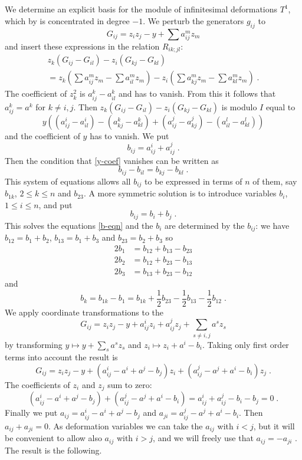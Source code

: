 \documentclass[12pt,a4paper]{amsart}  %
\theoremstyle{definition}
\theoremstyle{remark}
\begin{document}
\subsection{}
We determine an explicit basis for  the module of infinitesimal deformations   
$T^1$, which by \cite{Gr} is concentrated in degree $-1$. 
We perturb the generators $g_{ij}$ to
\[
G_{ij}=z_iz_j-y+\sum a_{ij}^mz_m
\]
and insert these expressions in the relation $R_{ik;jl}$:
\begin{multline*}
z_k(G_{ij}-G_{il})-z_i(G_{kj}-G_{kl})\\=
z_k\left(\sum a_{ij}^mz_m -\sum a_{il}^mz_m\right)
      -z_i\left(\sum a_{kj}^mz_m -\sum a_{kl}^mz_m\right)\;.
\end{multline*}
The coefficient of $z_k^2$ is $a_{ij}^k- a_{il}^k$ and has to vanish. From this it
follows that $a_{ij}^k=a^k$ for $k\neq i,j$. Then %
$z_k(G_{ij}-G_{il})-z_i(G_{kj}-G_{kl})$ is modulo $I$ equal to
\begin{equation}\label{y-coef}
y\left((a_{ij}^i-a_{il}^i)-(a_{kj}^k-a_{kl}^k)+(a_{ij}^j-a_{kj}^j)-(a_{il}^l-a_{kl}^l)\right)
\end{equation}
and the coefficient of $y$ has to vanish.
We put 
\[
b_{ij}=a_{ij}^i+a_{ij}^j\;.
\]
Then the condition that \eqref{y-coef} vanishes can be written as
\begin{equation}\label{b-eqn}
b_{ij}-b_{il}=b_{kj}-b_{kl}\;.
\end{equation}
This system of equations allows all $b_{ij}$ to be expressed in terms 
of $n$ of them, say $b_{1k}$, $2\leq k \leq n$ and $b_{23}$.  A more symmetric
solution is to introduce variables $b_i$, $1\leq i \leq n$, and put
\[
b_{ij} = b_i+b_j\;.
\]
This solves the equations \eqref{b-eqn} and the $b_i$ are determined by the
$b_{ij}$:
we have $b_{12}=b_1+b_2$, $b_{13}=b_1+b_3$ and $b_{23}=b_2+b_3$ so
\begin{align*}
2b_1&=b_{12}+b_{13}-b_{23}\\
2b_2&=b_{12}+b_{23}-b_{13}\\
2b_3&=b_{13}+b_{23}-b_{12}
\end{align*}
and
\[
b_k=b_{1k}-b_1=b_{1k}+\textstyle{\frac12 b_{23}-\frac12 b_{13}-\frac12 b_{12}}\;.
\]
We apply coordinate transformations to the
\[
G_{ij}=z_iz_j-y+ a_{ij}^iz_i+ a_{ij}^jz_j+ \sum_{s\neq i,j} a^sz_s
\]
by transforming 
$y\mapsto y+\sum_{s}a^s z_s$ and 
$ z_i\mapsto z_i+a^i-b_i$.
Taking only first order terms into account the result is
\[
G_{ij}=z_iz_j-y+ (a_{ij}^i-a^i+a^j-b_j)z_i+ (a_{ij}^j-a^j+a^i-b_i)z_j \;.
\]
The coefficients of $z_i$ and $z_j$ sum to zero:
\[
(a_{ij}^i-a^i+a^j-b_j)+ (a_{ij}^j-a^j+a^i-b_i)=
a_{ij}^i+ a_{ij}^j-b_i-b_j=0\;.
\]
Finally we put $a_{ij}=a_{ij}^i-a^i+a^j-b_j$ and
$a_{ji}=a_{ij}^j-a^j+a^i-b_i$. Then $a_{ij}+a_{ji}=0$.
As deformation variables we can take the $a_{ij}$ with $i<j$, 
but  it will
be convenient to allow also $a_{ij}$ with $i>j$, and we 
will freely use that $a_{ij}=-a_{ji}$ . The result is the following.
\end{document}
